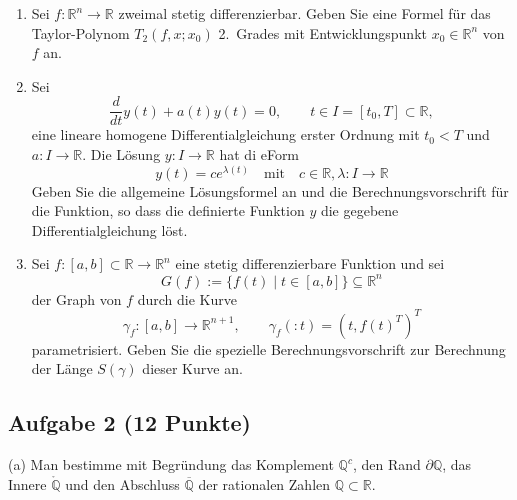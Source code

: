\begin{enumerate}
\item Sei $f:\mathbb{R}^n\to\mathbb{R}$ zweimal stetig differenzierbar. Geben Sie eine Formel für das Taylor-Polynom $T_2(f,x;x_0)$ 2.\ Grades mit Entwicklungspunkt $x_0\in\mathbb{R}^n$ von $f$ an.
\\

\item Sei
\[
\frac{d}{dt}y(t)+a(t)y(t)=0,\qquad t\in I=[t_0,T]\subset\mathbb{R},
\]
eine lineare homogene Differentialgleichung erster Ordnung mit $t_0 < T$ und $a:I\to\mathbb{R}$. Die Lösung $y:I\to \mathbb{R}$ hat di eForm
$$
y(t) = c e^{\lambda(t)} \quad \text{mit} \quad c \in \mathbb{R}, \lambda: I \to \mathbb{R}
$$
Geben Sie die allgemeine Lösungsformel an und die Berechnungsvorschrift für die Funktion, so dass die definierte Funktion $y$ die gegebene Differentialgleichung löst.
\\

\item Sei $f:[a,b]\subset\mathbb{R}\to\mathbb{R}^n$ eine stetig differenzierbare Funktion und sei 
$$
G(f) := \{f(t) \mid t \in [a,b]\} \subseteq \mathbb{R}^n
$$
der Graph von $f$ durch die Kurve
\[
\gamma_f:[a,b]\to\mathbb{R}^{n+1},\qquad \gamma_f(:t)=(t,f(t)^T)^{T}
\]
parametrisiert. Geben Sie die spezielle Berechnungsvorschrift zur Berechnung der Länge $S(\gamma)$ dieser Kurve an.
\\

\end{enumerate}



\newpage
\subsection*{Aufgabe 2 (12 Punkte)}
(a) Man bestimme mit Begründung das Komplement $\mathbb{Q}^c$, den Rand $\partial\mathbb{Q}$, das Innere $\mathring{\mathbb{Q}}$ und den Abschluss $\overline{\mathbb{Q}}$ der rationalen Zahlen $\mathbb{Q}\subset\mathbb{R}$. \hfill {}

